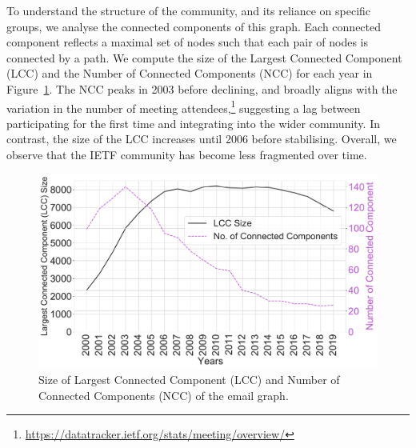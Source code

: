 \documentclass[twocolumn,10pt]{article}
\newlength{\figureWidthOneColumn}
\begin{document}
To understand the structure of the community, and its reliance on specific
groups, we analyse the connected components of this graph. Each connected
component reflects a maximal set of nodes such that each pair of nodes is
connected by a path. We compute the size of the Largest Connected Component
(LCC) and the Number of Connected Components (NCC) for each year in
Figure~\ref{fig:lcc_size_yearly}.  The NCC peaks in 2003 before declining,
and broadly aligns with the variation in the number of meeting
attendees,\footnote{\url{https://datatracker.ietf.org/stats/meeting/overview/}}
suggesting a lag between participating for the first time and integrating
into the wider community.  In contrast, the size of the LCC increases until
2006 before stabilising.  Overall, we observe that the IETF community has
become less fragmented over time.

\begin{figure}
  \centering
  \includegraphics[width=\figureWidthOneColumn]{figures-prev/icwsm-2022/lcc_yearly_no_components.pdf}
  \caption{
    Size of Largest Connected Component (LCC) and Number of Connected
    Components (NCC) of the email graph.
  }
  \label{fig:lcc_size_yearly}
\end{figure}
\end{document}
